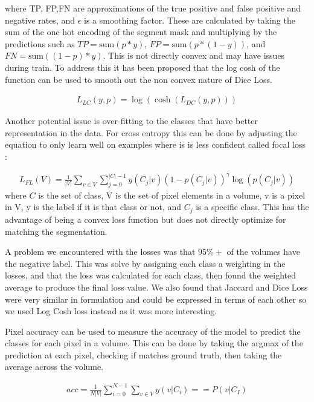 \documentclass[10pt,twocolumn,letterpaper]{article}
\begin{document}
where TP, FP,FN are approximations of the true positive and false positive and negative rates, and $\epsilon$ is a smoothing factor. These are calculated by taking the sum of the one hot encoding of the segment mask and multiplying by the predictions such as  $TP = \text{sum}(p*y)$, $FP = \text{sum}(p*(1-y))$, and $FN = \text{sum}((1-p)*y)$. This is not directly convex and may have issues during train. To address this it has been proposed that the log cosh \cite{SEG} of the function can be used to smooth out the non convex nature of Dice Loss.

\begin{align}
L_{LC}(y,p) = \log(\cosh(L_{DC}(y,p)))
\end{align}

Another potential issue is over-fitting to the classes that have better representation in the data. For cross entropy this can be done by adjusting the equation to only learn well on examples where is is less confident called focal loss \cite{SEG}:

\begin{align}
L_{FL}(V) = \frac{1}{|V|} \sum_{v \in V}  \sum_{j = 0 }^{|C|-1} y(C_j|v) (1-p(C_j|v))^\gamma  \log(p(C_j|v) ) 
\end{align}
where $C$ is the set of class, V is the set of pixel elements in a volume, v is a pixel in V, y is the label if it is that class or not, and $C_j$ is a specific class. This has the advantage of being a convex loss function but does not directly optimize for matching the segmentation.


A problem we encountered with the losses was that $95 \% + $ of the volumes have the negative label. This was solve by assigning each class a weighting in the losses, and that the loss was calculated for each class, then found the weighted average to produce the final loss value. We also found that Jaccard and Dice Loss were very similar in formulation and could be expressed in terms of each other so we used Log Cosh loss instead as it was more interesting.

Pixel accuracy \cite{MET} can be used to measure the accuracy of the model to predict the classes for each pixel in a volume. This can be done by taking the argmax of the prediction at each pixel, checking if matches ground truth, then taking the average across the volume. 

\begin{align}
acc = \frac{1}{N |V|} \sum_{i=0}^{N-1} \sum_{v \in V} y(v|C_i) == P(v|C_I)
\end{align}
\end{document}
